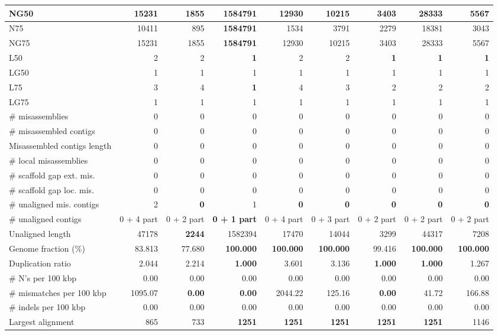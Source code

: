 \documentclass[12pt,a4paper]{article}
\begin{document}
\begin{table}[ht]
\begin{center}
\begin{tabular}{|l*{8}{|r}|}
NG50 & 15231 & 1855 & {\bf 1584791} & 12930 & 10215 & 3403 & 28333 & 5567 \\ \hline
N75 & 10411 & 895 & {\bf 1584791} & 1534 & 3791 & 2279 & 18381 & 3043 \\ \hline
NG75 & 15231 & 1855 & {\bf 1584791} & 12930 & 10215 & 3403 & 28333 & 5567 \\ \hline
L50 & 2 & 2 & {\bf 1} & 2 & 2 & {\bf 1} & {\bf 1} & {\bf 1} \\ \hline
LG50 & 1 & 1 & 1 & 1 & 1 & 1 & 1 & 1 \\ \hline
L75 & 3 & 4 & {\bf 1} & 4 & 3 & 2 & 2 & 2 \\ \hline
LG75 & 1 & 1 & 1 & 1 & 1 & 1 & 1 & 1 \\ \hline
\# misassemblies & 0 & 0 & 0 & 0 & 0 & 0 & 0 & 0 \\ \hline
\# misassembled contigs & 0 & 0 & 0 & 0 & 0 & 0 & 0 & 0 \\ \hline
Misassembled contigs length & 0 & 0 & 0 & 0 & 0 & 0 & 0 & 0 \\ \hline
\# local misassemblies & 0 & 0 & 0 & 0 & 0 & 0 & 0 & 0 \\ \hline
\# scaffold gap ext. mis. & 0 & 0 & 0 & 0 & 0 & 0 & 0 & 0 \\ \hline
\# scaffold gap loc. mis. & 0 & 0 & 0 & 0 & 0 & 0 & 0 & 0 \\ \hline
\# unaligned mis. contigs & 2 & {\bf 0} & 1 & {\bf 0} & {\bf 0} & {\bf 0} & {\bf 0} & {\bf 0} \\ \hline
\# unaligned contigs & 0 + 4 part & 0 + 2 part & {\bf 0 + 1 part} & 0 + 4 part & 0 + 3 part & 0 + 2 part & 0 + 2 part & 0 + 2 part \\ \hline
Unaligned length & 47178 & {\bf 2244} & 1582394 & 17470 & 14044 & 3299 & 44317 & 7208 \\ \hline
Genome fraction (\%) & 83.813 & 77.680 & {\bf 100.000} & {\bf 100.000} & {\bf 100.000} & 99.416 & {\bf 100.000} & {\bf 100.000} \\ \hline
Duplication ratio & 2.044 & 2.214 & {\bf 1.000} & 3.601 & 3.136 & {\bf 1.000} & {\bf 1.000} & 1.267 \\ \hline
\# N's per 100 kbp & 0.00 & 0.00 & 0.00 & 0.00 & 0.00 & 0.00 & 0.00 & 0.00 \\ \hline
\# mismatches per 100 kbp & 1095.07 & {\bf 0.00} & {\bf 0.00} & 2044.22 & 125.16 & {\bf 0.00} & 41.72 & 166.88 \\ \hline
\# indels per 100 kbp & 0.00 & 0.00 & 0.00 & 0.00 & 0.00 & 0.00 & 0.00 & 0.00 \\ \hline
Largest alignment & 865 & 733 & {\bf 1251} & {\bf 1251} & {\bf 1251} & {\bf 1251} & {\bf 1251} & 1146 \\ \hline

\end{tabular}
\end{center}
\end{table}
\end{document}
